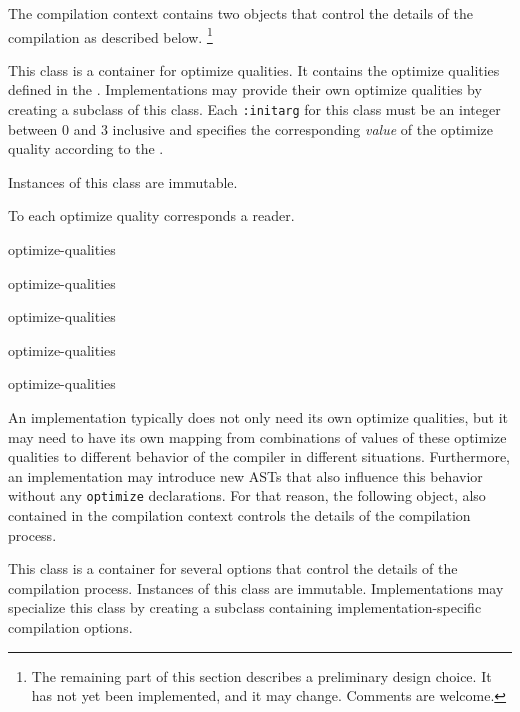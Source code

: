 The compilation context contains two objects that control the details
of the compilation as described below.%
\footnote{The remaining part of this section describes a preliminary
  design choice.  It has not yet been implemented, and it may change.
  Comments are welcome.}


This class is a container for optimize qualities.  It contains the
optimize qualities defined in the \hs{}.  Implementations may provide
their own optimize qualities by creating a subclass of this class.
Each \texttt{:initarg} for this class must be an integer between $0$ and
$3$ inclusive and specifies the corresponding \emph{value} of the
optimize quality according to the \hs{}.

Instances of this class are immutable.






To each optimize quality corresponds a reader.

 {optimize-qualities}

 {optimize-qualities}

 {optimize-qualities}

 {optimize-qualities}

 {optimize-qualities}

An implementation typically does not only need its own optimize
qualities, but it may need to have its own mapping from combinations
of values of these optimize qualities to different behavior of the
compiler in different situations.  Furthermore, an implementation may
introduce new ASTs that also influence this behavior without any
\texttt{optimize} declarations.  For that reason, the following
object, also contained in the compilation context controls the details
of the compilation process.


This class is a container for several options that control the
details of the compilation process.  Instances of this class are
immutable.  Implementations may specialize this class by creating a
subclass containing implementation-specific compilation options.

